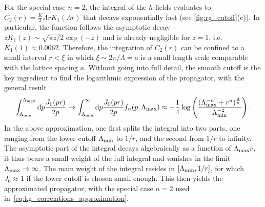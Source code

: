 For the special case $n=2$, the integral of the $h$-fields evaluates to $C_2(r)=\frac K2 \Lambda r K_1(\Lambda r)$ that decays exponentially fast (see \cref{fig:rg_cutoff}(c)).
In particular, the function follows the asymptotic decay $z K_1(z) \sim \sqrt{\pi z/2}\exp(-z)$ and is already negligible for $z=1$, i.e. $K_1(1)\approx0.0062$.
Therefore, the integration of $C_2(r)$ can be confined to a small interval $r<\xi$ in which $\xi\sim2\pi/\Lambda=a$ is a small length scale comparable with the lattice spacing $a$.
Without going into full detail, the smooth cutoff is the key ingredient to find the logarithmic expression of the propagator, with the general result
\begin{align}
    \int_{\Lambda_{\rm min}}^{\Lambda_{\rm max}}\mathrm d p\frac{J_0(pr)}{2p}\rightarrow\int_{\Lambda_{\rm min}}^{\infty}\mathrm d p\frac{J_0(pr)}{2p}f_n(p,\Lambda_{\rm max})\approx-\frac14\log\left( \frac{(\Lambda_{\rm max}^{-n}+r^n)^{\frac 2n}}{\Lambda_{\rm min}^{-2}} \right).
\end{align}
In the above approximation, one first splits the integral into two parts, one ranging from the lower cutoff $\Lambda_{\rm min}$ to $1/r$, and the second from $1/r$ to infinity.
The asymptotic part of the integral decays algebraically as a function of $\Lambda_{\rm max}r$, it thus bears a small weight of the full integral and vanishes in the limit $\Lambda_{\rm max}\rightarrow\infty$.
The main weight of the integral resides in $[\Lambda_{\rm min},1/r]$, for which $J_0\approx1$ if the lower cutoff is chosen small enough.
This then yields the approximated propagator, with the special case $n=2$ used in~\cref{eq:kg_correlations_approximation}.


